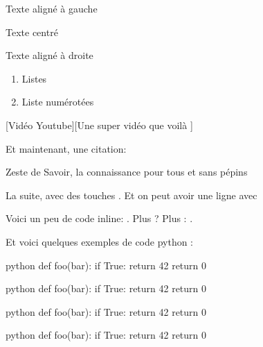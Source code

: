 \documentclass[small]{zmdocument}
\begin{document}
\begin{flushleft}
Texte aligné à gauche
\end{flushleft}

\begin{center}
Texte centré
\end{center}

\begin{flushright}
Texte aligné à droite
\end{flushright}

\begin{enumerate}
\item Listes
\item Liste numérotées
\end{enumerate}

[Vidéo Youtube][Une super vidéo que voilà ]


Et maintenant, une citation:

\begin{Quotation}[Clem]
Zeste de Savoir, la connaissance pour tous et sans pépins
\end{Quotation}

La suite, avec des touches . Et on peut avoir une ligne avec

\horizontalLine

Voici un peu de code inline: . Plus ? Plus : .


Et voici quelques exemples de code python :

\begin{CodeBlock}{python}
def foo(bar):
    if True:
        return 42
    return 0
\end{CodeBlock}

\begin{CodeBlock}{python}
def foo(bar):
    if True:
        return 42
    return 0
\end{CodeBlock}

\begin{CodeBlock}{python}
def foo(bar):
    if True:
        return 42
    return 0
\end{CodeBlock}

\begin{CodeBlock}[][1, 3-4]{python}
def foo(bar):
    if True:
        return 42
    return 0
\end{CodeBlock}
\end{document}
